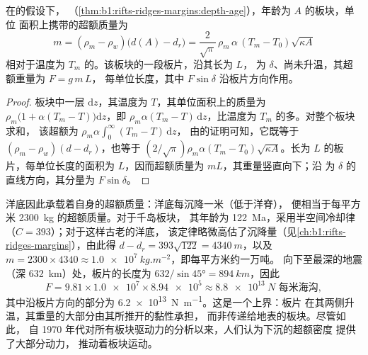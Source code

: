 \begin{proposition}[板片的超额重量]\label{prop:b1:active-margins:slab-weight}
在的假设下，
（\cref{thm:b1:rifts-ridges-margins:depth-age}），年龄为 $A$ 的板块，单位
面积上携带的超额质量为
\[
  m = (\rho_m - \rho_w)\bigl(d(A) - d_r\bigr)
    = \frac{2}{\sqrt\pi}\,\rho_m\,\alpha\,(T_m - T_0)\sqrt{\kappa A}
\]
相对于温度为 $T_m$ 的。该板块的一段板片，沿其长为 $L$，
为 $\delta$、尚未升温，其超额重量为 $F = g\,m\,L$，
每单位长度，其中 $F\sin\delta$ 沿板片方向作用。
\end{proposition}

\begin{proof}
板块中一层 $\mathrm dz$，其温度为 $T$，其单位面积上的质量为
$\rho_m\bigl(1 + \alpha(T_m - T)\bigr)\mathrm dz$，即
$\rho_m\alpha(T_m - T)\,\mathrm dz$，比温度为 $T_m$ 的多。对整个板块求和，
该超额为 $\rho_m\alpha\int_0^\infty (T_m - T)\,\mathrm dz$，
由的证明可知，它既等于
$(\rho_m - \rho_w)(d - d_r)$，也等于 $(2/\sqrt\pi)\rho_m\alpha(T_m - T_0)
\sqrt{\kappa A}$。长为 $L$ 的板片，每单位长度的面积为
$L$，因而超额质量为 $mL$，其重量竖直向下；沿
为 $\delta$ 的直线方向，其分量为 $F\sin\delta$。
\end{proof}

洋底因此承载着自身的超额质量：洋底每沉降一米（低于洋脊），
便相当于每平方米 \qty{2300}{kg} 的超额质量。对于千岛板块，
其年龄为 \qty{122}{Ma}，采用半空间冷却律（$C = 393$）；对于这样古老的洋底，
该定律略微高估了沉降量（见\cref{ch:b1:rifts-ridges-margins}），由此得
$d - d_r = 393\sqrt{122} = \qty{4340}{m}$，以及
$m = 2300\times4340 \approx \qty{1.0e7}{kg.m^{-2}}$，即每平方米约一万吨。
向下至最深的地震（深 \qty{632}{km}）处，板片的长度为
$632/\sin\ang{45} = \qty{894}{km}$，因此
\[
  F = 9.81 \times \num{1.0e7} \times \num{8.94e5} \approx \qty{8.8e13}{N}
  \text{ 每米海沟},
\]
其中沿板片方向的部分为 \qty{6.2e13}{N.m^{-1}}。这是一个上界：板片
在其两侧升温，其重量的大部分由其所推开的黏性承担，
而非传递给地表的板块。尽管如此，
自 1970 年代对所有板块驱动力的分析以来，人们认为下沉的超额密度
提供了大部分动力，
推动着板块运动。

